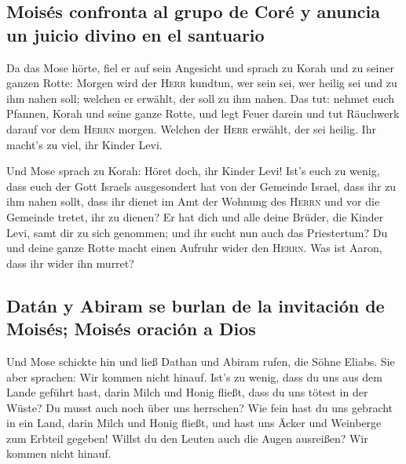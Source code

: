 \hypertarget{moisuxe9s-confronta-al-grupo-de-coruxe9-y-anuncia-un-juicio-divino-en-el-santuario}{%
\subsection{Moisés confronta al grupo de Coré y anuncia un juicio divino
en el
santuario}\label{moisuxe9s-confronta-al-grupo-de-coruxe9-y-anuncia-un-juicio-divino-en-el-santuario}}

 Da das Mose hörte, fiel er auf sein Angesicht
 und sprach zu Korah und zu seiner ganzen Rotte: Morgen
wird der \textsc{Herr} kundtun, wer sein sei, wer heilig sei und zu ihm
nahen soll; welchen er erwählt, der soll zu ihm nahen. 
Das tut: nehmet euch Pfannen, Korah und seine ganze Rotte,
 und legt Feuer darein und tut Räuchwerk darauf vor dem
\textsc{Herrn} morgen. Welchen der \textsc{Herr} erwählt, der sei
heilig. Ihr macht's zu viel, ihr Kinder Levi.

 Und Mose sprach zu Korah: Höret doch, ihr Kinder Levi!
 Ist's euch zu wenig, dass euch der Gott Israels
ausgesondert hat von der Gemeinde Israel, dass ihr zu ihm nahen sollt,
dass ihr dienet im Amt der Wohnung des \textsc{Herrn} und vor die
Gemeinde tretet, ihr zu dienen?  Er hat dich und alle
deine Brüder, die Kinder Levi, samt dir zu sich genommen; und ihr sucht
nun auch das Priestertum?  Du und deine ganze Rotte macht
einen Aufruhr wider den \textsc{Herrn}. Was ist Aaron, dass ihr wider
ihn murret?

\hypertarget{datuxe1n-y-abiram-se-burlan-de-la-invitaciuxf3n-de-moisuxe9s-moisuxe9s-oraciuxf3n-a-dios}{%
\subsection{Datán y Abiram se burlan de la invitación de Moisés; Moisés
oración a
Dios}\label{datuxe1n-y-abiram-se-burlan-de-la-invitaciuxf3n-de-moisuxe9s-moisuxe9s-oraciuxf3n-a-dios}}

 Und Mose schickte hin und ließ Dathan und Abiram rufen,
die Söhne Eliabs. Sie aber sprachen: Wir kommen nicht hinauf.
 Ist's zu wenig, dass du uns aus dem Lande geführt hast,
darin Milch und Honig fließt, dass du uns tötest in der Wüste? Du musst
auch noch über uns herrschen?  Wie fein hast du uns
gebracht in ein Land, darin Milch und Honig fließt, und hast uns Äcker
und Weinberge zum Erbteil gegeben! Willst du den Leuten auch die Augen
ausreißen? Wir kommen nicht hinauf.

